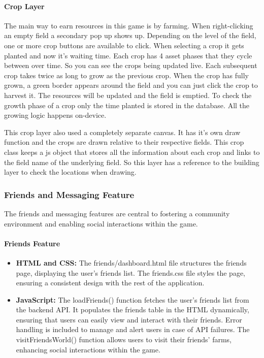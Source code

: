 \documentclass[12pt]{article}
\begin{document}
\paragraph{Crop Layer} The main way to earn resources in this game is by farming. When right-clicking an empty field a secondary pop up shows up. Depending on the level of the field, one or more crop buttons are available to click. When selecting a crop it gets planted and now it's waiting time. Each crop has 4 asset phases that they cycle between over time. So you can see the crops being updated live. Each subsequent crop takes twice as long to grow as the previous crop. When the crop has fully grown, a green border appears around the field and you can just click the crop to harvest it. The resources will be updated and the field is emptied. To check the growth phase of a crop only the time planted is stored in the database. All the growing logic happens on-device.

This crop layer also used a completely separate canvas. It has it's own draw function and the crops are drawn relative to their respective fields. This crop class keeps a js object that stores all the information about each crop and links to the field name of the underlying field. So this layer has a reference to the building layer to check the locations when drawing.



\subsubsection{Friends and Messaging Feature}
The friends and messaging features are central to fostering a community environment and enabling social interactions within the game.
\paragraph{Friends Feature}
\begin{itemize}
    \item \textbf{HTML and CSS:} The friends/dashboard.html file structures the friends page, displaying the user's friends list. The friends.css file styles the page, ensuring a consistent design with the rest of the application.
    \item \textbf{JavaScript:} The loadFriends() function fetches the user's friends list from the backend API. It populates the friends table in the HTML dynamically, ensuring that users can easily view and interact with their friends. Error handling is included to manage and alert users in case of API failures. The visitFriendsWorld() function allows users to visit their friends' farms, enhancing social interactions within the game.
\end{itemize}
\end{document}
